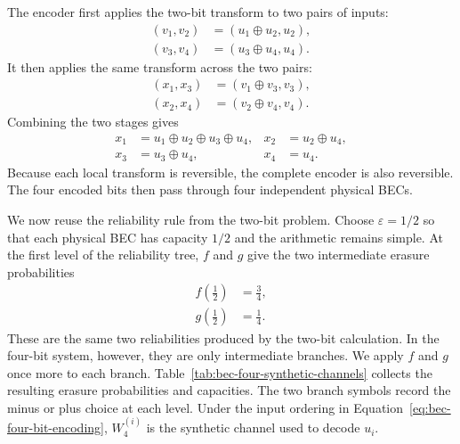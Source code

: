 The encoder first applies the two-bit transform to two pairs of inputs:
\begin{equation}
\begin{aligned}
(v_1,v_2)&=(u_1\oplus u_2,u_2),\\
(v_3,v_4)&=(u_3\oplus u_4,u_4).
\end{aligned}
\label{eq:bec-four-bit-first-encoding-stage}
\end{equation}
It then applies the same transform across the two pairs:
\begin{equation}
\begin{aligned}
(x_1,x_3)&=(v_1\oplus v_3,v_3),\\
(x_2,x_4)&=(v_2\oplus v_4,v_4).
\end{aligned}
\label{eq:bec-four-bit-second-encoding-stage}
\end{equation}
Combining the two stages gives
\begin{equation}
\begin{aligned}
x_1&=u_1\oplus u_2\oplus u_3\oplus u_4,
&x_2&=u_2\oplus u_4,\\
x_3&=u_3\oplus u_4,
&x_4&=u_4.
\end{aligned}
\label{eq:bec-four-bit-encoding}
\end{equation}
Because each local transform is reversible, the complete encoder is also reversible. The four encoded bits then pass through four independent physical BECs.

We now reuse the reliability rule from the two-bit problem. Choose $\varepsilon=1/2$ so that each physical BEC has capacity $1/2$ and the arithmetic remains simple. At the first level of the reliability tree, $f$ and $g$ give the two intermediate erasure probabilities
\begin{align}
f\!\left(\frac12\right)&=\frac34,
\label{eq:bec-four-first-level-minus}\\
g\!\left(\frac12\right)&=\frac14.
\label{eq:bec-four-first-level-plus}
\end{align}
These are the same two reliabilities produced by the two-bit calculation. In the four-bit system, however, they are only intermediate branches. We apply $f$ and $g$ once more to each branch. Table~\ref{tab:bec-four-synthetic-channels} collects the resulting erasure probabilities and capacities. The two branch symbols record the minus or plus choice at each level. Under the input ordering in Equation~\eqref{eq:bec-four-bit-encoding}, $W_4^{(i)}$ is the synthetic channel used to decode $u_i$.

\vspace{0.2cm}

